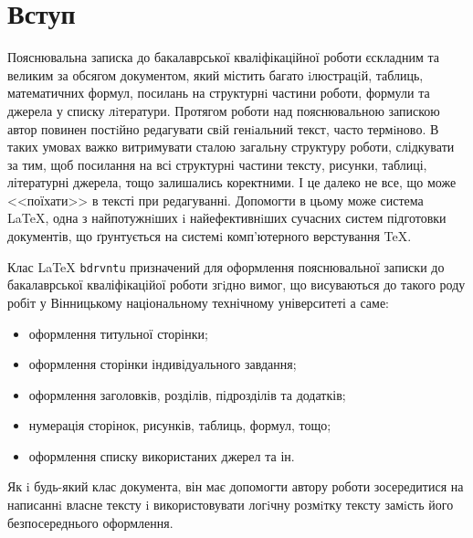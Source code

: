 \chapter*{Вступ}

Пояснювальна записка до бакалаврської кваліфікаційної роботи є\linebreak складним та великим за обсягом документом, який містить
багато iлюстрацiй, таблиць, математичних формул, посилань на структурнi частини роботи, формули та джерела у списку 
лiтератури. Протягом роботи над пояснювальною запискою автор повинен постiйно редагувати свiй генiальний текст,
часто термiново. В таких умовах важко витримувати сталою загальну структуру роботи, слідкувати за тим, щоб посилання
на всі структурні частини тексту, рисунки, таблиці, літературні джерела, тощо залишались коректними. І це далеко не все,
що може <<поїхати>> в тексті при редагуванні. Допомогти в цьому може система \LaTeX, одна з найпотужнiших i найефективнiших 
сучасних систем підготовки документів, що ґрунтується на системi комп’ютерного верстування \TeX \cite{latexctan}.

Клас {\LaTeX} {\verb|bdrvntu|} призначений для оформлення пояснювальної записки до бакалаврської кваліфікаційої роботи згiдно вимог,
що висуваються до такого роду робіт у Вінницькому національному технічному університеті а саме:

\begin{itemize}
\item оформлення титульної сторінки;
\item оформлення сторінки індивідуального завдання;
\item оформлення заголовків, розділів, підрозділів та додатків;
\item нумерація сторінок, рисунків, таблиць, формул, тощо;
\item оформлення списку використаних джерел та ін.
\end{itemize} 

Як i будь-який клас документа, він має допомогти автору роботи зосередитися на написаннi власне тексту i використовувати 
логiчну розмiтку тексту замiсть його безпосереднього оформлення.
